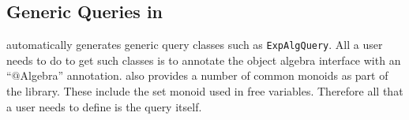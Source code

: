 \subsection{Generic Queries in \name}

\name automatically generates generic query classes such as
\lstinline{ExpAlgQuery}. All a user needs to do to get such classes
is to annotate the object algebra interface with an ``$@$Algebra''
annotation. \name also provides a number of common monoids as
part of the library. These include the set monoid used in free variables.
Therefore all that a user needs to define is the query itself.
